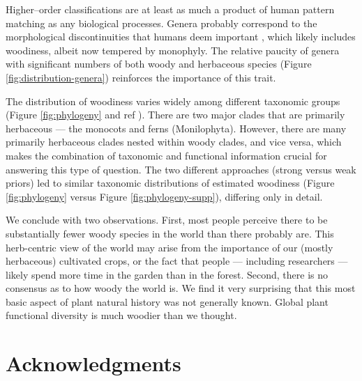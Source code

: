 \documentclass[12pt]{article}
\begin{document}
Higher--order classifications are at least as much a product of human
pattern matching as any biological processes.  Genera probably
correspond to the morphological discontinuities that humans deem
important \citep{scotland2004significance}, which likely includes
woodiness, albeit now tempered by monophyly.  The relative paucity of
genera with significant numbers of both woody and herbaceous species
(Figure \ref{fig:distribution-genera}) reinforces the importance of
this trait.

The distribution of woodiness varies widely among different taxonomic
groups (Figure \ref{fig:phylogeny} and ref
\citep{sinnott1915evolution}).  There are two major clades that are
primarily herbaceous --- the monocots and ferns
(Monilophyta). However, there are many primarily herbaceous clades
nested within woody clades, and vice versa, which makes the
combination of taxonomic and functional information crucial for
answering this type of question.  The two different approaches (strong
versus weak priors) led to similar taxonomic distributions of
estimated woodiness (Figure \ref{fig:phylogeny} versus Figure
\ref{fig:phylogeny-supp}), differing only in detail.

We conclude with two observations.
%
First, most people perceive there to be substantially fewer woody
species in the world than there probably are.  This herb-centric view
of the world may arise from the importance of our (mostly herbaceous)
cultivated crops, or the fact that people --- including researchers
--- likely spend more time in the garden than in the forest.
%
Second, there is no consensus as to how woody the world is.  We find
it very surprising that this most basic aspect of plant natural
history was not generally known.  Global plant functional diversity is
much woodier than we thought.

\section{Acknowledgments}
\end{document}
